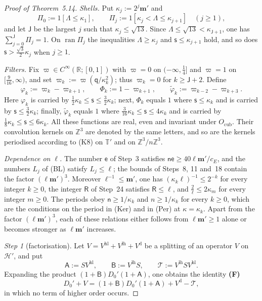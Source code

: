 \documentclass[11pt]{amsart}
\theoremstyle{definition}
\begin{document}
\begin{proof}[Proof of Theorem~5.14]
\emph{Shells.}
Put $\kappa_j:=2^j\mathbf m'$ and
\begin{equation*}
\Pi_0:=1[\Lambda\le\kappa_1],\qquad\Pi_j:=1[\kappa_j<\Lambda\le\kappa_{j+1}]\quad(j\ge1),
\end{equation*}
and let $\mathsf J$ be the largest $j$ such that $\kappa_j\le\sqrt{13}$.
Since $\Lambda\le\sqrt{13}<\kappa_{\mathsf J+1}$, one has $\sum_{j=0}^{\mathsf J}\Pi_j=1$.
On $\operatorname{ran}\Pi_j$ the inequalities $\Lambda\ge\kappa_j$ and $\mathsf s\le\kappa_{j+1}$ hold, and so does $\mathsf s>\frac{\sqrt3}{2}\kappa_j$ when $j\ge1$.

\emph{Filters.}
Fix $\varpi\in C^\infty(\mathbb R;[0,1])$ with $\varpi=0$ on $(-\infty,\frac14]$ and $\varpi=1$ on $[\frac9{16},\infty)$, and set $\varpi_k:=\varpi(\mathsf q/\kappa_k^2)$;
thus $\varpi_k=0$ for $k\ge\mathsf J+2$.
Define
\begin{equation*}
\varphi_k:=\varpi_k-\varpi_{k+1},\qquad\Phi_k:=1-\varpi_{k+1},\qquad\tilde\varphi_k:=\varpi_{k-2}-\varpi_{k+3}.
\end{equation*}
Here $\varphi_k$ is carried by $\frac12\kappa_k\le\mathsf s\le\frac32\kappa_k$;
next, $\Phi_k$ equals $1$ where $\mathsf s\le\kappa_k$ and is carried by $\mathsf s\le\frac32\kappa_k$;
finally, $\tilde\varphi_k$ equals $1$ where $\frac3{16}\kappa_k\le\mathsf s\le4\kappa_k$ and is carried by $\frac18\kappa_k\le\mathsf s\le6\kappa_k$.
All these functions are real, even and invariant under $O_{\mathrm{cub}}$.
Their convolution kernels on $\mathbb Z^3$ are denoted by the same letters, and so are the kernels periodised according to (K8) on $\mathbb T'$ and on $\mathbb Z^3/n\mathbb Z^3$.

\emph{Dependence on $\ell$.}
The number $\mathsf e$ of Step~3 satisfies $\mathsf n\mathsf e\ge40\ell\mathbf m'/c_E$, and the numbers $L_j$ of (BL) satisfy $L_j\le\ell$;
the bounds of Steps~8, 11 and~18 contain the factor $(\ell\mathbf m')^3$.
Moreover $\ell^{-1}\le\mathbf m'$, one has $(\kappa_k\ell)^{-1}\le2^{-k}$ for every integer $k\ge0$, the integer $\mathsf R$ of Step~24 satisfies $\mathsf R\le\ell$, and $\frac2\ell\le2\kappa_m$ for every integer $m\ge0$.
The periods obey $\mathsf n\ge1/\kappa_k$ and $n\ge1/\kappa_k$ for every $k\ge0$, which are the conditions on the period in (Ker) and in (Per) at $\kappa=\kappa_k$.
Apart from the factor $(\ell\mathbf m')^3$, each of these relations either follows from $\ell\mathbf m'\ge1$ alone or becomes stronger as $\ell\mathbf m'$ increases.

\emph{Step 1} (factorisation).
Let $V=V^{\mathrm{hl}}+V^{\mathrm{lh}}+V^{\mathrm d}$ be a splitting of an operator $V$ on $\mathcal H'$, and put
\begin{equation*}
\mathsf A:=SV^{\mathrm{hl}},\qquad\mathsf B:=V^{\mathrm{lh}}S,\qquad\mathcal T:=V^{\mathrm{lh}}SV^{\mathrm{hl}}.
\end{equation*}
Expanding the product $(1+\mathsf B)D_0'(1+\mathsf A)$, one obtains the identity \textbf{(F)}
\begin{equation}
\tag{F}
D_0'+V=(1+\mathsf B)D_0'(1+\mathsf A)+V^{\mathrm d}-\mathcal T,
\end{equation}
in which no term of higher order occurs.


\end{proof}
\end{document}
